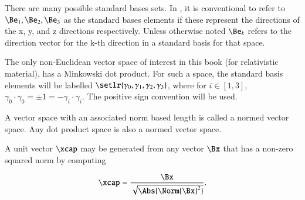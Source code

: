 There are many possible standard bases sets.  In , it is conventional to refer to \( \Be_1, \Be_2, \Be_3 \) as the standard bases elements if these represent the directions of the x, y, and z directions respectively.  Unless otherwise noted \( \Be_k \) refers to the direction vector for the k-th direction in a standard basis for that space.

The only non-Euclidean vector space of interest in this book (for relativistic material), has a Minkowski dot product.  For such a space, the standard basis elements will be labelled \( \setlr{ \gamma_0, \gamma_1, \gamma_2, \gamma_3 } \), where for \( i \in [1,3] \), \( \gamma_0 \cdot \gamma_0 = \pm 1 = -\gamma_i \cdot \gamma_i \).  The positive sign convention will be used.



A vector space with an associated norm based length is called a normed vector space.  Any dot product space is also a normed vector space.


A unit vector \( \xcap \) may be generated from any vector \( \Bx \) that has a non-zero squared norm by computing

\begin{dmath}\label{eqn:multivector:220}
\xcap = \frac{\Bx}{\sqrt{\Abs{\Norm{\Bx}^2}}}.
\end{dmath}



